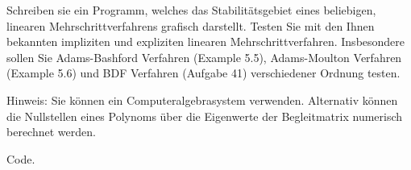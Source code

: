\begin{exercise}
  Schreiben sie ein Programm, welches das Stabilitätsgebiet
  eines beliebigen, linearen Mehrschrittverfahrens grafisch
  darstellt. Testen Sie mit den Ihnen bekannten impliziten
  und expliziten linearen Mehrschrittverfahren. Insbesondere
  sollen Sie Adams-Bashford Verfahren (Example 5.5),
  Adams-Moulton Verfahren (Example 5.6) und BDF Verfahren
  (Aufgabe 41) verschiedener Ordnung testen.

  Hinweis: Sie können ein Computeralgebrasystem verwenden.
  Alternativ können die Nullstellen eines Polynoms über die
  Eigenwerte der Begleitmatrix numerisch berechnet werden.
\end{exercise}

\begin{solution}
  Code.
\end{solution}
